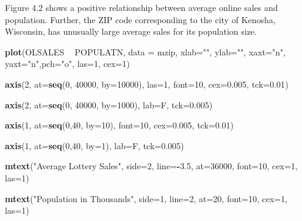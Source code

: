 \documentclass[]{book}
\newenvironment{Shaded}{\begin{snugshade}}{\end{snugshade}}
\newcommand{\DataTypeTok}[1]{\textcolor[rgb]{0.13,0.29,0.53}{#1}}
\newcommand{\DecValTok}[1]{\textcolor[rgb]{0.00,0.00,0.81}{#1}}
\newcommand{\FloatTok}[1]{\textcolor[rgb]{0.00,0.00,0.81}{#1}}
\newcommand{\KeywordTok}[1]{\textcolor[rgb]{0.13,0.29,0.53}{\textbf{#1}}}
\newcommand{\NormalTok}[1]{#1}
\newcommand{\OperatorTok}[1]{\textcolor[rgb]{0.81,0.36,0.00}{\textbf{#1}}}
\newcommand{\StringTok}[1]{\textcolor[rgb]{0.31,0.60,0.02}{#1}}
\begin{document}
Figure 4.2 shows a positive relationship between average online sales and population. Further, the ZIP code corresponding to the city of Kenosha, Wisconsin, has unusually large average sales for its population size.

\begin{Shaded}
\begin{Highlighting}[]
\KeywordTok{plot}\NormalTok{(OLSALES }\OperatorTok{~}\StringTok{ }\NormalTok{POPULATN, }\DataTypeTok{data =}\NormalTok{ mzip, }\DataTypeTok{xlab=}\StringTok{""}\NormalTok{, }\DataTypeTok{ylab=}\StringTok{""}\NormalTok{, }\DataTypeTok{xaxt=}\StringTok{"n"}\NormalTok{, }\DataTypeTok{yaxt=}\StringTok{"n"}\NormalTok{,}\DataTypeTok{pch=}\StringTok{"o"}\NormalTok{, }\DataTypeTok{las=}\DecValTok{1}\NormalTok{, }\DataTypeTok{cex=}\DecValTok{1}\NormalTok{)}

\KeywordTok{axis}\NormalTok{(}\DecValTok{2}\NormalTok{, }\DataTypeTok{at=}\KeywordTok{seq}\NormalTok{(}\DecValTok{0}\NormalTok{, }\DecValTok{40000}\NormalTok{, }\DataTypeTok{by=}\DecValTok{10000}\NormalTok{), }\DataTypeTok{las=}\DecValTok{1}\NormalTok{, }\DataTypeTok{font=}\DecValTok{10}\NormalTok{, }\DataTypeTok{cex=}\FloatTok{0.005}\NormalTok{, }\DataTypeTok{tck=}\FloatTok{0.01}\NormalTok{)}

\KeywordTok{axis}\NormalTok{(}\DecValTok{2}\NormalTok{, }\DataTypeTok{at=}\KeywordTok{seq}\NormalTok{(}\DecValTok{0}\NormalTok{, }\DecValTok{40000}\NormalTok{, }\DataTypeTok{by=}\DecValTok{1000}\NormalTok{), }\DataTypeTok{lab=}\NormalTok{F, }\DataTypeTok{tck=}\FloatTok{0.005}\NormalTok{)}

\KeywordTok{axis}\NormalTok{(}\DecValTok{1}\NormalTok{, }\DataTypeTok{at=}\KeywordTok{seq}\NormalTok{(}\DecValTok{0}\NormalTok{,}\DecValTok{40}\NormalTok{, }\DataTypeTok{by=}\DecValTok{10}\NormalTok{), }\DataTypeTok{font=}\DecValTok{10}\NormalTok{, }\DataTypeTok{cex=}\FloatTok{0.005}\NormalTok{, }\DataTypeTok{tck=}\FloatTok{0.01}\NormalTok{)}

\KeywordTok{axis}\NormalTok{(}\DecValTok{1}\NormalTok{, }\DataTypeTok{at=}\KeywordTok{seq}\NormalTok{(}\DecValTok{0}\NormalTok{,}\DecValTok{40}\NormalTok{, }\DataTypeTok{by=}\DecValTok{1}\NormalTok{), }\DataTypeTok{lab=}\NormalTok{F, }\DataTypeTok{tck=}\FloatTok{0.005}\NormalTok{)}

\KeywordTok{mtext}\NormalTok{(}\StringTok{"Average Lottery Sales"}\NormalTok{, }\DataTypeTok{side=}\DecValTok{2}\NormalTok{, }\DataTypeTok{line=}\OperatorTok{-}\FloatTok{3.5}\NormalTok{, }\DataTypeTok{at=}\DecValTok{36000}\NormalTok{, }\DataTypeTok{font=}\DecValTok{10}\NormalTok{, }\DataTypeTok{cex=}\DecValTok{1}\NormalTok{, }\DataTypeTok{las=}\DecValTok{1}\NormalTok{)}

\KeywordTok{mtext}\NormalTok{(}\StringTok{"Population in Thousands"}\NormalTok{, }\DataTypeTok{side=}\DecValTok{1}\NormalTok{, }\DataTypeTok{line=}\DecValTok{2}\NormalTok{, }\DataTypeTok{at=}\DecValTok{20}\NormalTok{, }\DataTypeTok{font=}\DecValTok{10}\NormalTok{, }\DataTypeTok{cex=}\DecValTok{1}\NormalTok{, }\DataTypeTok{las=}\DecValTok{1}\NormalTok{)}
\end{Highlighting}
\end{Shaded}
\end{document}
